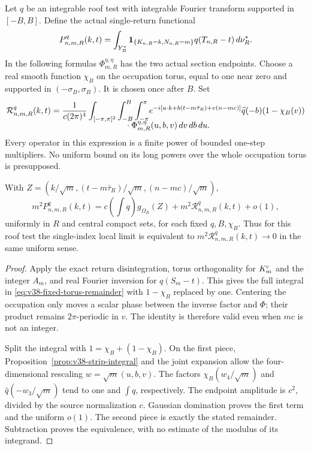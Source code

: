 Let $q$ be an integrable roof test with integrable Fourier transform
supported in $[-B,B]$. Define the actual single-return functional
\begin{equation}\label{eq:v38-band-return-functional}
 P^q_{n,m,R}(k,t)=\int_{Y_R^*}
 \one_{\{K_{n,R}=k,N_{n,R}=m\}}q(T_{n,R}-t)\,d\nu_R^*.
\end{equation}
In the following formulas $\Phi^{\eta,\eta}_{m,R}$ has the two actual
section endpoints. Choose a real smooth function $\chi_B$ on the
occupation torus, equal to one near zero and supported in
$(-\sigma_B,\sigma_B)$. It is chosen once after $B$.
Set
\begin{align}\label{eq:v38-fixed-torus-remainder}
 \mathcal R^q_{n,m,R}(k,t)=\frac1{c(2\pi)^4}
 \int_{[-\pi,\pi]^2}\int_{-B}^{B}\int_{-\pi}^{\pi}
 &e^{-i[u\cdot k+b(t-m\bar\tau_R)+v(n-mc)]}
 \widehat q(-b)(1-\chi_B(v))\notag\\[-2mm]
 &\hspace{-10mm}\cdot\Phi^{\eta,\eta}_{m,R}(u,b,v)\,dv\,db\,du.
\end{align}
Every operator in this expression is a finite power of bounded
one-step multipliers. No uniform bound on its long powers over the
whole occupation torus is presupposed.

\begin{proposition}
\label{prop:v38-exact-index-remainder}
With $Z=(k/\sqrt m,(t-m\bar\tau_R)/\sqrt m,(n-mc)/\sqrt m)$,
\begin{equation}\label{eq:v38-exact-index-remainder}
 m^2P^q_{n,m,R}(k,t)
 =c\left(\int q\right)g_{\Omega_R}(Z)
          +m^2\mathcal R^q_{n,m,R}(k,t)+o(1),
\end{equation}
uniformly in $R$ and central compact sets, for each fixed $q,B,\chi_B$.
Thus for this roof test the single-index local limit is equivalent to
$m^2\mathcal R^q_{n,m,R}(k,t)\to0$ in the same uniform sense.
\end{proposition}
\begin{proof}
Apply the exact return disintegration, torus orthogonality for
$K_m^{\rm c}$ and the integer $A_m$, and real Fourier inversion for
$q(S_m-t)$. This gives the full integral in
\eqref{eq:v38-fixed-torus-remainder} with $1-\chi_B$ replaced by one.
Centering the occupation only moves a scalar phase between the inverse
factor and $\Phi$; their product remains $2\pi$-periodic in $v$.
The identity is therefore valid even when $mc$ is not an integer.

Split the integral with $1=\chi_B+(1-\chi_B)$. On the first piece,
Proposition~\ref{prop:v38-strip-integral} and the joint expansion
allow the four-dimensional rescaling $w=\sqrt m(u,b,v)$.
The factors $\chi_B(w_4/\sqrt m)$ and
$\widehat q(-w_3/\sqrt m)$ tend to one and $\int q$, respectively.
The endpoint amplitude is $c^2$, divided by the source normalization
$c$. Gaussian domination proves the first term and the uniform $o(1)$.
The second piece is exactly the stated remainder. Subtraction proves
the equivalence, with no estimate of the modulus of its integrand.
\end{proof}

